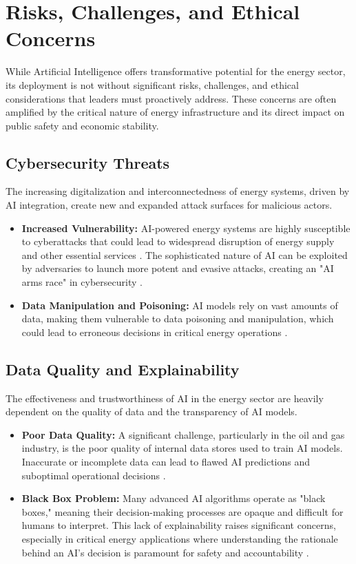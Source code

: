 \section{Risks, Challenges, and Ethical Concerns}

While Artificial Intelligence offers transformative potential for the energy sector, its deployment is not without significant risks, challenges, and ethical considerations that leaders must proactively address. These concerns are often amplified by the critical nature of energy infrastructure and its direct impact on public safety and economic stability.

\subsection{Cybersecurity Threats}
The increasing digitalization and interconnectedness of energy systems, driven by AI integration, create new and expanded attack surfaces for malicious actors.
\begin{itemize}
    \item \textbf{Increased Vulnerability:} AI-powered energy systems are highly susceptible to cyberattacks that could lead to widespread disruption of energy supply and other essential services \cite{SustainLivWork_AI_Energy}. The sophisticated nature of AI can be exploited by adversaries to launch more potent and evasive attacks, creating an "AI arms race" in cybersecurity \cite{Webasha_AI_Cybersecurity}.
    \item \textbf{Data Manipulation and Poisoning:} AI models rely on vast amounts of data, making them vulnerable to data poisoning and manipulation, which could lead to erroneous decisions in critical energy operations \cite{EnergyGov_AI_Energy_Initial}.
\end{itemize}

\subsection{Data Quality and Explainability}
The effectiveness and trustworthiness of AI in the energy sector are heavily dependent on the quality of data and the transparency of AI models.
\begin{itemize}
    \item \textbf{Poor Data Quality:} A significant challenge, particularly in the oil and gas industry, is the poor quality of internal data stores used to train AI models. Inaccurate or incomplete data can lead to flawed AI predictions and suboptimal operational decisions \cite{EnergyNow_AI_Energy}.
    \item \textbf{Black Box Problem:} Many advanced AI algorithms operate as "black boxes," meaning their decision-making processes are opaque and difficult for humans to interpret. This lack of explainability raises significant concerns, especially in critical energy applications where understanding the rationale behind an AI's decision is paramount for safety and accountability \cite{SustainabilityDirectory_AI_Energy, CognitiveView_XAI}.
\end{itemize}

